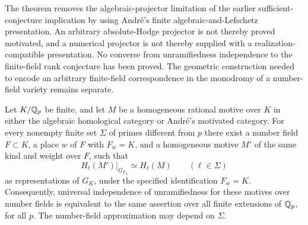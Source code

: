 \begin{remark}
\label{c:motivated-rank-reduction-scope}
The theorem removes the algebraic-projector limitation of the
earlier sufficient-conjecture implication by using Andr\'e's
finite algebraic-and-Lefschetz presentation. An arbitrary
absolute-Hodge projector is not thereby proved motivated,
and a numerical projector is not thereby supplied with a
realization-compatible presentation. No converse from
unramifiedness independence to the finite-field rank conjecture
has been proved. The geometric construction needed to encode
an arbitrary finite-field correspondence in the monodromy of
a number-field variety remains separate.
\end{remark}


\begin{proposition}
\label{c:local-global-motive-approximation}
Let $K/\mathbb Q_p$ be finite, and let $M$ be a homogeneous rational
motive over $K$ in either the algebraic homological category or
Andr\'e's motivated category.
For every nonempty finite set $\Sigma$ of primes different from $p$
there exist a number field $F\subset K$, a place $w$ of $F$ with
$F_w=K$, and a homogeneous motive $M'$ of the same kind and weight
over $F$, such that
\[
 H_\ell(M')|_{G_{F_w}}\simeq H_\ell(M)
 \qquad(\ell\in\Sigma)
\]
as representations of $G_K$, under the specified identification
$F_w=K$.
Consequently, universal independence of unramifiedness for these
motives over number fields is equivalent to the same assertion over
all finite extensions of $\mathbb Q_p$, for all $p$.
The number-field approximation may depend on $\Sigma$.
\end{proposition}

